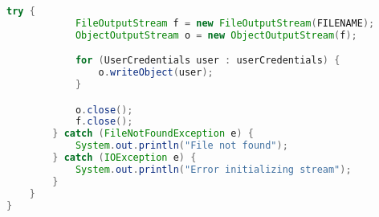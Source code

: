 \begin{lstlisting}[language=java, caption={listener of context changes}]
        try {
            FileOutputStream f = new FileOutputStream(FILENAME);
            ObjectOutputStream o = new ObjectOutputStream(f);

            for (UserCredentials user : userCredentials) {
                o.writeObject(user);
            }

            o.close();
            f.close();
        } catch (FileNotFoundException e) {
            System.out.println("File not found");
        } catch (IOException e) {
            System.out.println("Error initializing stream");
        }
    }
}
\end{lstlisting}